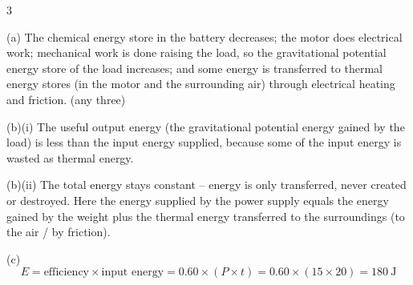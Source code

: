 \begin{question}{3}
\markscheme
{}
\endms

\exemplar
(a) The chemical energy store in the battery decreases; the motor does electrical work; mechanical work is done raising the load, so the gravitational potential energy store of the load increases; and some energy is transferred to thermal energy stores (in the motor and the surrounding air) through electrical heating and friction. (any three)

(b)(i) The useful output energy (the gravitational potential energy gained by the load) is less than the input energy supplied, because some of the input energy is wasted as thermal energy.

(b)(ii) The total energy stays constant -- energy is only transferred, never created or destroyed. Here the energy supplied by the power supply equals the energy gained by the weight plus the thermal energy transferred to the surroundings (to the air / by friction).

(c) $$ E = \text{efficiency} \times \text{input energy} = 0.60 \times (P \times t) = 0.60 \times (15 \times 20) = 180\ \text{J} $$
\endexemplar
\end{question}

